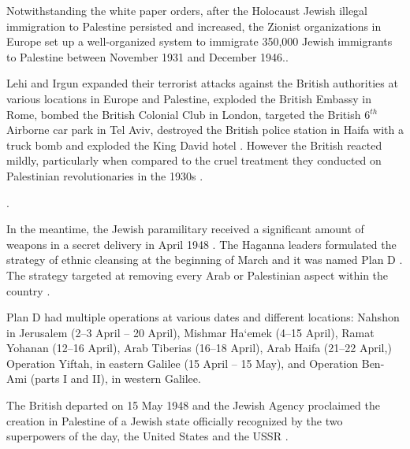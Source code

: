 Notwithstanding the white paper orders, after the Holocaust Jewish illegal immigration to Palestine persisted and increased, the Zionist organizations in Europe set up a well-organized system to immigrate 350,000 Jewish immigrants to Palestine between November 1931 and December 1946.\citep{Grob-Fitzgibbon2011, Heller1995}.   

Lehi and Irgun expanded their terrorist attacks against the British authorities at various locations in Europe and Palestine, exploded the British Embassy in Rome, bombed the British Colonial Club in London, targeted the British 6$^{th}$ Airborne car park in Tel Aviv, destroyed the British police station in Haifa with a truck bomb and exploded the King David hotel \citep{Bell1976}. However the British reacted mildly, particularly when compared to the cruel treatment they conducted on Palestinian revolutionaries in the 1930s \citep{Pappe2006}.
 
 
 
 
\cite[p.40]{Pappe2006}.
 
In the meantime, the Jewish paramilitary received a significant amount of weapons in a secret delivery in April 1948 \citep{Morris2008, Pappe2006}. 
The Haganna leaders formulated the strategy of ethnic cleansing at the beginning of March and it was named Plan D \citep{Shlaim2014}. The strategy targeted at removing every Arab or Palestinian aspect within the country \citep{Pappe2006, Shlaim2014}.
 
Plan D had multiple operations at various dates and different locations:
Nahshon in Jerusalem (2–3 April – 20 April),
Mishmar Ha‘emek (4–15 April),
Ramat Yohanan (12–16 April),
Arab Tiberias (16–18 April), 
Arab Haifa (21–22 April,)
Operation Yiftah, in eastern Galilee (15 April – 15 May), and
Operation Ben-Ami (parts I and II), in western Galilee\citep{Morris2004}.

The British departed on 15 May 1948 and the Jewish Agency proclaimed the creation in Palestine of a Jewish state officially recognized by the two superpowers of the day, the United States and the USSR \citep{Pappe2006}.
 
